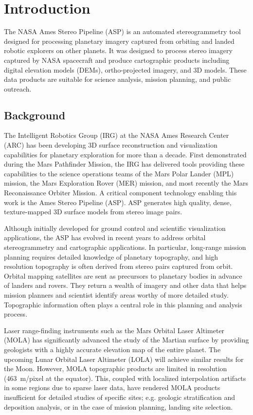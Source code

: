 \chapter{Introduction}

The NASA Ames Stereo Pipeline (ASP) is an automated stereogrammetry
tool designed for processing planetary imagery captured from orbiting
and landed robotic explorers on other planets.  It was designed to
process stereo imagery captured by NASA spacecraft and produce
cartographic products including digital elevation models (DEMs),
ortho-projected imagery, and 3D models.  These data products are
suitable for science analysis, mission planning, and public outreach.

\section{Background}

The Intelligent Robotics Group (IRG) at the NASA Ames Research Center
(ARC) has been developing 3D surface reconstruction and visualization
capabilities for planetary exploration for more than a decade.  First
demonstrated during the Mars Pathfinder Mission, the IRG has delivered
tools providing these capabilities to the science operations teams of
the Mars Polar Lander (MPL) mission, the Mars Exploration Rover (MER)
mission, and most recently the Mars Reconaissance Orbiter Mission. A
critical component technology enabling this work is the Ames Stereo
Pipeline (ASP).  ASP generates high quality, dense, texture-mapped
3D surface models from stereo image pairs.

Although initially developed for ground control and scientific
visualization applications, the ASP has evolved in recent years to
address orbital stereogrammetry and cartographic applications.  In
particular, long-range mission planning requires detailed knowledge of
planetary topography, and high resolution topography is often derived
from stereo pairs captured from orbit.  Orbital mapping satellites are
sent as precursors to planetary bodies in advance of landers and
rovers.  They return a wealth of imagery and other data that helps
mission planners and scientist identify areas worthy of more detailed
study. Topographic information often plays a central role in this
planning and analysis process.

Laser range-finding instruments such as the Mars Orbital Laser
Altimeter (MOLA) \citep{1992JGR....97.7781Z,2001JGR...10623689S}
has signiﬁcantly advanced the study of the Martian surface by
providing geologists with a highly accurate elevation map of the
entire planet.  The upcoming Lunar Orbital Laser Altimeter (LOLA)
\citep{2008AGUFM.P31B1419N,2007SSRv..129..391C} will achieve similar
results for the Moon.  However, MOLA topographic products are limited
in resolution (463~m/pixel at the equator).  This, coupled with
localized interpolation artifacts in some regions due to sparse
laser data, have rendered MOLA products insufficient for detailed
studies of speciﬁc sites; e.g. geologic stratification and deposition
analysis, or in the case of mission planning, landing site selection.

